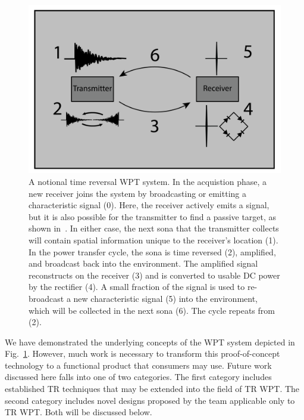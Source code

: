 \begin{figure}[t]
\includegraphics[width=\columnwidth]{figs/future/WPTSys}
\caption{A notional time reversal WPT system. In the acquistion phase, a new receiver joins the system by broadcasting or emitting a characteristic signal (0). Here, the receiver actively emits a signal, but it is also possible for the transmitter to find a passive target, as shown in~\cite{nltr-wave-chaotic}. In either case, the next sona that the transmitter collects will contain spatial information unique to the receiver's location (1). In the power transfer cycle, the sona is time reversed (2), amplified, and broadcast back into the environment. The amplified signal reconstructs on the receiver (3) and is converted to usable DC power by the rectifier (4). A small fraction of the signal is used to re-broadcast a new characteristic signal (5) into the environment, which will be collected in the next sona (6). The cycle repeats from (2).}
\label{fig:SysImage}
\end{figure}

We have demonstrated the underlying concepts of the WPT system depicted in Fig.~\ref{fig:SysImage}.
However, much work is necessary to transform this proof-of-concept technology to a functional product that consumers may use.
Future work discussed here falls into one of two categories. The first category includes established TR techniques that may be extended into the field of TR WPT.
The second category includes novel designs proposed by the team applicable only to TR WPT. Both will be discussed below. 

